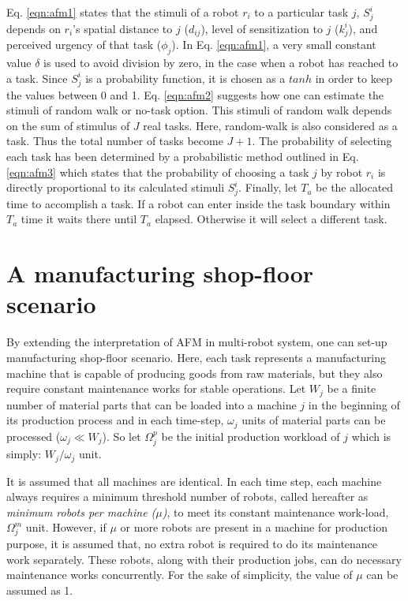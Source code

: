 Eq. \ref{eqn:afm1} states that the stimuli of a robot $r_i$ to a particular task $j$, $S^{i}_{j}$ depends on $r_i$'s spatial distance to $j$ ($d_{ij}$), level of sensitization to $j$ ($k_{j}^{i}$), and perceived urgency of that task ($\phi _{j}$). In  Eq. \ref{eqn:afm1},  a very small constant value $\delta$ is used to avoid division by zero, in the case when a robot has reached to a task. Since $S^{i}_{j}$ is a probability function, it is chosen as a $tanh$ in order to keep the values between 0 and 1. Eq. \ref{eqn:afm2} suggests how  one can estimate the stimuli of random walk or no-task option. This stimuli of random walk depends on the sum of stimulus of $J$ real tasks. Here, random-walk is also considered as a task. Thus the total number of tasks become $J+1$. The probability of selecting each task has been determined by a probabilistic method outlined in Eq. \ref{eqn:afm3} which states that the probability of choosing a task $j$ by robot $r_i$ is directly proportional to its calculated stimuli $ S^i_j$. Finally, let $T_a$ be the allocated time to accomplish a task. If a robot can enter inside the task boundary within $T_a$ time it waits there until $T_a$ elapsed. Otherwise it will select a different task.
\section{A manufacturing shop-floor scenario}
\label{afm:vms}
By extending the interpretation of AFM in multi-robot system, one can set-up manufacturing shop-floor  scenario. Here, each task represents a manufacturing machine that is  capable of producing goods from raw materials, but they also require constant maintenance works for stable operations. Let $W_{j}$ be a finite number of material parts that can be loaded into a machine $j$ in the beginning of its production process and in each time-step, $\omega_{j}$ units of material parts can be processed  ($\omega_{j} \ll W_{j} $). So let $\Omega_{j}^{p}$ be the initial production workload of $j$ which is simply: $W_{j} / \omega_{j}$ unit.

It is assumed that all machines are identical. In each time step, each machine always requires a minimum threshold number of robots, called hereafter as {\em minimum robots per machine ($\mu$)}, to meet its constant maintenance work-load, $\Omega_{j}^{m}$ unit. However, if $\mu$ or more robots are present in a machine for production purpose, it is assumed that, no extra robot is required to do its maintenance work separately. These robots, along with their production jobs, can do necessary maintenance works concurrently. For the sake of simplicity, the value of $\mu$ can be assumed as 1.

